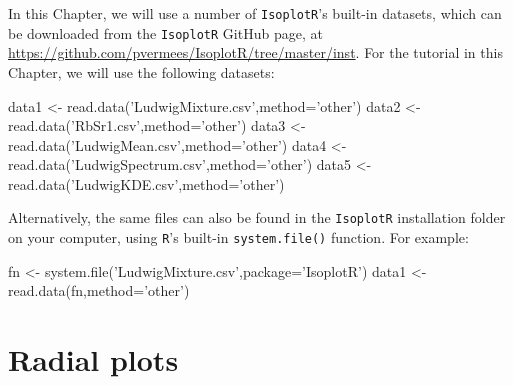 \begin{refsection}
In this Chapter, we will use a number of \texttt{IsoplotR}'s built-in
datasets, which can be downloaded from the \texttt{IsoplotR} GitHub
page, at
\url{https://github.com/pvermees/IsoplotR/tree/master/inst}. For the
tutorial in this Chapter, we will use the following datasets:

\begin{script}
data1 <- read.data('LudwigMixture.csv',method='other')
data2 <- read.data('RbSr1.csv',method='other')
data3 <- read.data('LudwigMean.csv',method='other')
data4 <- read.data('LudwigSpectrum.csv',method='other')
data5 <- read.data('LudwigKDE.csv',method='other')
\end{script}

Alternatively, the same files can also be found in the
\texttt{IsoplotR} installation folder on your computer, using
\texttt{R}'s built-in \texttt{system.file()} function. For example:

\begin{script}
fn <- system.file('LudwigMixture.csv',package='IsoplotR')
data1 <- read.data(fn,method='other')
\end{script}

\section{Radial plots}\label{sec:OtherRadial}


\end{refsection}

